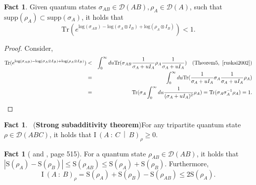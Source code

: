 \documentclass[11pt,a4paper]{article}
\theoremstyle{plain}
\theoremstyle{definition}
\newtheorem{fact}[theorem]{Fact}
\newcommand {\br} [1] {\ensuremath{ \left( #1 \right) }}
\newcommand {\minusspace} {\: \! \!}
\newcommand {\smallspace} {\: \!}
\newcommand {\fn} [2] {\ensuremath{ #1 \minusspace \br{ #2 } }}
\newcommand {\mutinf} [2] {\fn{\mathrm{I}}{#1 \smallspace : \smallspace #2}}
\newcommand {\condmutinf} [3] {\mutinf{#1}{#2 \smallspace \middle\vert \smallspace #3}}
\newcommand {\abs} [1] {\ensuremath{ \left| #1 \right| }}
\newcommand {\Tr} {\ensuremath{ \mathrm{Tr} }}
\begin{document}
\begin{fact}
\label{fact:ruskai}
Given quantum states $\sigma_{AB}\in \mathcal{D}(AB), \rho_A\in \mathcal{D}(A)$, such that $\text{supp}(\rho_A)\subset\text{supp}(\sigma_A)$, it holds that 
$$\Tr(e^{\text{log}(\sigma_{AB})-\text{log}(\sigma_{A}\otimes I_B)+\text{log}(\rho_{A}\otimes I_B)})<1.$$
\end{fact}
\begin{proof}
Consider, 
\begin{eqnarray*}
\Tr(e^{\text{log}(\sigma_{AB})-\text{log}(\sigma_{A}\otimes I_B)+\text{log}(\rho_{A}\otimes I_B)}) &<& \int_{0}^{\infty}du\Tr(\sigma_{AB}\frac{1}{\sigma_A+uI_A}\rho_A\frac{1}{\sigma_A+uI_A}) \quad (\text{Theorem} 5, ~\cite{ruskai2002} ) \\ 
&=&  \int_{0}^{\infty}du\Tr(\frac{1}{\sigma_A+uI_A}\sigma_{A}\frac{1}{\sigma_A+uI_A}\rho_A) \\
&=& \Tr(\sigma_{A}\int_{0}^{\infty}du\frac{1}{(\sigma_A+uI_A)^2}\rho_A) = \Tr(\sigma_A\sigma^{-1}_A\rho_A) =1.
\end{eqnarray*}
\end{proof}

\begin{fact}~\cite{Lieb:1973,LiebR:1973}(\textbf{Strong subadditivity theorem})\label{fact:strongsubadditivity}
For any tripartite quantum state $\rho\in\mathcal{D}(ABC)$, it holds that $\condmutinf{A}{C}{B}_{\rho}\geq0$.	
\end{fact}

\begin{fact}[\cite{LiebAraki:1970} and \cite{NielsenC00}, page 515]\label{fact:conditionalmutinf}
For a quantum state $\rho_{AB}\in\mathcal{D}(AB)$, it holds that $\abs{\mathrm{S}(\rho_A)-\mathrm{S}(\rho_B)}\leq\mathrm{S}(\rho_{AB})\leq\mathrm{S}(\rho_A)+\mathrm{S}(\rho_B)$. Furthermore,
\[\mutinf{A}{B}_{\rho}=\mathrm{S}(\rho_A)+\mathrm{S}(\rho_B)-\mathrm{S}(\rho_{AB})\leq 2\mathrm{S}(\rho_A).\]
\end{fact}
\end{document}
